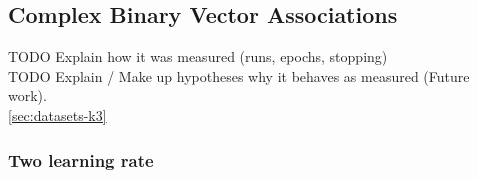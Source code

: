 

\subsection{Complex Binary Vector Associations} 
\label{sec:results-k3}

TODO Explain how it was measured (runs, epochs, stopping) \\
TODO Explain / Make up hypotheses why it behaves as measured (Future work). \\

\ref{sec:datasets-k3} 


\subsubsection{Two learning rate} 
\label{sec:tlr-k3}

